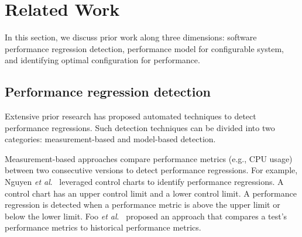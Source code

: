 \section{Related Work}
\label{sec:relatedwork}

In this section, we discuss prior work along three dimensions: software performance regression detection, performance model for configurable system, and identifying optimal configuration for performance. %

\subsection{Performance regression detection}
Extensive prior research has proposed automated techniques to detect performance regressions. Such detection techniques can be divided into two categories: measurement-based and model-based detection. 

Measurement-based approaches compare performance metrics (e.g., CPU usage) between two consecutive versions to detect performance regressions. %
For example, Nguyen \emph{et al$.$}~\cite{Nguyen:2012:ADP,nguyen2011automated,Nguyen:2014:ICS} %
leveraged control charts to identify performance regressions. %
A control chart has an upper control limit and a lower control limit. A performance regression is detected when a performance metric is above the upper limit or below the lower limit. Foo \emph{et al$.$}~\cite{foo2010mining} proposed an approach that compares a test's performance metrics to historical performance metrics. %

